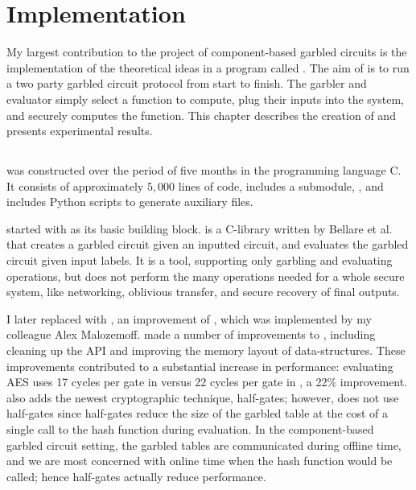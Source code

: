 
\chapter{Implementation}

My largest contribution to the project of component-based garbled circuits is the implementation of the theoretical ideas in a program called \CompGC. 
The aim of \CompGC is to run a two party garbled circuit protocol from start to finish. 
The garbler and evaluator simply select a function to compute, plug their inputs into the system, and \CompGC securely computes the function.
This chapter describes the creation of \CompGC and presents experimental results. 

\section{\CompGC}

\CompGC was constructed over the period of five months in the programming language C. 
It consists of approximately $5,000$ lines of code, includes a submodule, \LibGarble, and includes Python scripts to generate auxiliary files. 

\CompGC started with \JustGarble as its basic building block.
\JustGarble is a C-library written by Bellare et al. \cite{justgarble} that creates a garbled circuit given an inputted circuit, and evaluates the garbled circuit given input labels. 
It is a tool, supporting only garbling and evaluating operations, but does not perform the many operations needed for a whole secure system, like networking, oblivious transfer, and secure recovery of final outputs. 

I later replaced \JustGarble with \LibGarble, an improvement of \JustGarble, which was implemented by my colleague Alex Malozemoff.
\LibGarble made a number of improvements to \JustGarble, including cleaning up the API and improving the memory layout of  data-structures.
These improvements contributed to a substantial increase in performance: evaluating AES uses 17 cycles per gate in \LibGarble versus 22 cycles per gate in \JustGarble, a 22\% improvement. 
\LibGarble also adds the newest cryptographic technique, half-gates; however, \CompGC does not use half-gates since half-gates reduce the size of the garbled table at the cost of a single call to the hash function during evaluation. 
In the component-based garbled circuit setting, the garbled tables are communicated during offline time, and we are most concerned with online time when the hash function would be called; hence half-gates actually reduce performance.


